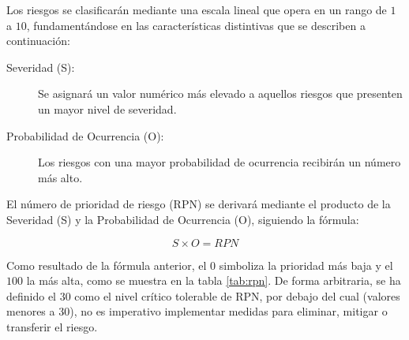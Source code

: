 

\newcommand{\colorcell}[1]{%
	\ifnum#1<10 \cellcolor{GreenColor}%
	\else\ifnum#1<20 \cellcolor{GreenColor!50}%
	\else\ifnum#1<30 \cellcolor{GreenColor!30}%
	\else\ifnum#1<40 \cellcolor{LightRed}%
	\else\ifnum#1<50 \cellcolor{RedColor!50}%
	\else\ifnum#1<60 \cellcolor{RedColor!60}%
	\else\ifnum#1<70 \cellcolor{RedColor!70}%
	\else\ifnum#1<80 \cellcolor{RedColor!80}%
	\else\ifnum#1<90 \cellcolor{RedColor!90}%
	\else \cellcolor{RedColor}%
	\fi\fi\fi\fi\fi\fi\fi\fi\fi
	#1%
}


Los riesgos se clasificarán mediante una escala lineal que opera en un rango de \(1\) a \(10\), fundamentándose en las características distintivas que se describen a continuación:

\begin{description}
	\item[Severidad (S):] Se asignará un valor numérico más elevado a aquellos riesgos que presenten un mayor nivel de severidad.
	\item[Probabilidad de Ocurrencia (O):] Los riesgos con una mayor probabilidad de ocurrencia recibirán un número más alto.
\end{description}

El número de prioridad de riesgo (RPN) se derivará mediante el producto de la Severidad (S) y la Probabilidad de Ocurrencia (O), siguiendo la fórmula:

\[ S \times O = RPN \]

Como resultado de la fórmula anterior, el \(0\) simboliza la prioridad más baja y el \(100\) la más alta, como se muestra en la tabla \ref{tab:rpn}. De forma arbitraria, se ha definido el \(30\) como el nivel crítico tolerable de RPN, por debajo del cual (valores menores a 30), no es imperativo implementar medidas para eliminar, mitigar o transferir el riesgo.





